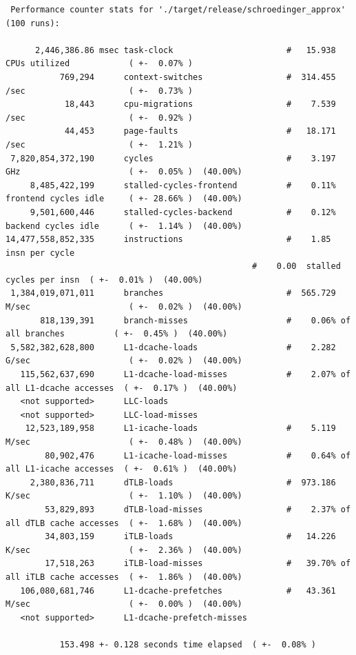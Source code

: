\documentclass[11pt,DIV=10,final]{scrreprt} %
\begin{document}
{\begin{appendix}
\begin{lstlisting}
 Performance counter stats for './target/release/schroedinger_approx' (100 runs):

      2,446,386.86 msec task-clock                       #   15.938 CPUs utilized            ( +-  0.07% )
           769,294      context-switches                 #  314.455 /sec                     ( +-  0.73% )
            18,443      cpu-migrations                   #    7.539 /sec                     ( +-  0.92% )
            44,453      page-faults                      #   18.171 /sec                     ( +-  1.21% )
 7,820,854,372,190      cycles                           #    3.197 GHz                      ( +-  0.05% )  (40.00%)
     8,485,422,199      stalled-cycles-frontend          #    0.11% frontend cycles idle     ( +- 28.66% )  (40.00%)
     9,501,600,446      stalled-cycles-backend           #    0.12% backend cycles idle      ( +-  1.14% )  (40.00%)
14,477,558,852,335      instructions                     #    1.85  insn per cycle
                                                  #    0.00  stalled cycles per insn  ( +-  0.01% )  (40.00%)
 1,384,019,071,011      branches                         #  565.729 M/sec                    ( +-  0.02% )  (40.00%)
       818,139,391      branch-misses                    #    0.06% of all branches          ( +-  0.45% )  (40.00%)
 5,582,382,628,800      L1-dcache-loads                  #    2.282 G/sec                    ( +-  0.02% )  (40.00%)
   115,562,637,690      L1-dcache-load-misses            #    2.07% of all L1-dcache accesses  ( +-  0.17% )  (40.00%)
   <not supported>      LLC-loads
   <not supported>      LLC-load-misses
    12,523,189,958      L1-icache-loads                  #    5.119 M/sec                    ( +-  0.48% )  (40.00%)
        80,902,476      L1-icache-load-misses            #    0.64% of all L1-icache accesses  ( +-  0.61% )  (40.00%)
     2,380,836,711      dTLB-loads                       #  973.186 K/sec                    ( +-  1.10% )  (40.00%)
        53,829,893      dTLB-load-misses                 #    2.37% of all dTLB cache accesses  ( +-  1.68% )  (40.00%)
        34,803,159      iTLB-loads                       #   14.226 K/sec                    ( +-  2.36% )  (40.00%)
        17,518,263      iTLB-load-misses                 #   39.70% of all iTLB cache accesses  ( +-  1.86% )  (40.00%)
   106,080,681,746      L1-dcache-prefetches             #   43.361 M/sec                    ( +-  0.00% )  (40.00%)
   <not supported>      L1-dcache-prefetch-misses

           153.498 +- 0.128 seconds time elapsed  ( +-  0.08% )
\end{lstlisting}


\end{appendix}}
\end{document}
